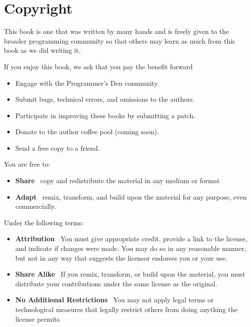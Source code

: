 \documentclass[../main.tex]{subfiles}
\begin{document}
\chapter*{Copyright}

This book is one that was written by many hands and is freely
given to the broader programming community so that others may learn as
much from this book as we did writing it.

\vspace{1cm}

If you enjoy this book, we ask that you pay the benefit forward \textemdash
\begin{itemize}
    \item Engage with the Programmer's Den community.
    \item Submit bugs, technical errors, and omissions to the authors.
    \item Participate in improving these books by submitting a patch.
    \item Donate to the author coffee pool (coming soon).
    \item Send a free copy to a friend.
\end{itemize}

\vspace{1cm}

You are free to:
\begin{itemize}
    \item \textbf{Share} \textemdash\  copy and redistribute the
        material in any medium or format
        
    \item \textbf{Adapt} \textemdash\  remix, transform, and build
        upon the material for any purpose, even commercially.
\end{itemize}

\vspace{0.5cm}

Under the following terms:
\begin{itemize}
    \item \textbf{Attribution} \textemdash\  You must give appropriate
        credit, provide a link to the license, and indicate if changes
        were made. You may do so in any reasonable manner, but not in
        any way that suggests the licensor endorses you or your use.
    
    \item \textbf{Share Alike} \textemdash\  If you remix, transform, or
        build upon the material, you must distribute your contributions
        under the same license as the original.
    
    \item \textbf{No Additional Restrictions} \textemdash\  You may not
        apply legal terms or technological measures that legally restrict
        others from doing anything the license permits.
\end{itemize}
\end{document}

